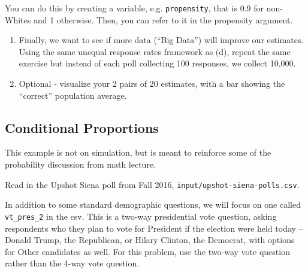 \documentclass[]{book}
\theoremstyle{definition}
\theoremstyle{definition}
\theoremstyle{definition}
\theoremstyle{remark}
\begin{document}
You can do this by creating a variable, e.g. \texttt{propensity}, that is 0.9 for non-Whites and 1 otherwise. Then, you can refer to it in the propensity argument.

\begin{enumerate}
\def\labelenumi{(\alph{enumi})}
\setcounter{enumi}{4}
\item
  Finally, we want to see if more data (``Big Data'') will improve our estimates. Using the same unequal response rates framework as (d), repeat the same exercise but instead of each poll collecting 100 responses, we collect 10,000.
\item
  Optional - visualize your 2 pairs of 20 estimates, with a bar showing the ``correct'' population average.
\end{enumerate}

\hypertarget{conditional-proportions}{%
\subsection*{Conditional Proportions}\label{conditional-proportions}}

This example is not on simulation, but is meant to reinforce some of the probability discussion from math lecture.

Read in the Upshot Siena poll from Fall 2016, \texttt{input/upshot-siena-polls.csv}.

In addition to some standard demographic questions, we will focus on one called \texttt{vt\_pres\_2} in the csv. This is a two-way presidential vote question, asking respondents who they plan to vote for President if the election were held today -- Donald Trump, the Republican, or Hilary Clinton, the Democrat, with options for Other candidates as well. For this problem, use the two-way vote question rather than the 4-way vote question.
\end{document}
